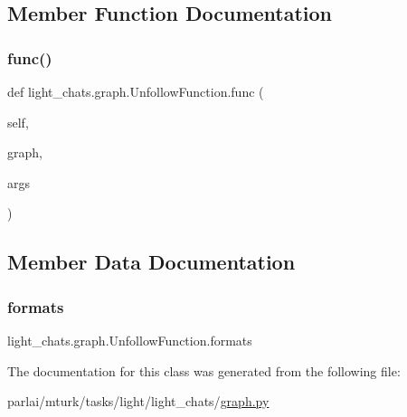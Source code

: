 \subsection{Member Function Documentation}
\mbox{\label{classlight__chats_1_1graph_1_1UnfollowFunction_a09b37c0a471f8dd65216e434a98983af}} 
\subsubsection{\texorpdfstring{func()}{func()}}
{\footnotesize\ttfamily def light\+\_\+chats.\+graph.\+Unfollow\+Function.\+func (\begin{DoxyParamCaption}\item[{}]{self,  }\item[{}]{graph,  }\item[{}]{args }\end{DoxyParamCaption})}



\subsection{Member Data Documentation}
\mbox{\label{classlight__chats_1_1graph_1_1UnfollowFunction_a9b7464a052add385de3d685e1627fcf5}} 
\subsubsection{\texorpdfstring{formats}{formats}}
{\footnotesize\ttfamily light\+\_\+chats.\+graph.\+Unfollow\+Function.\+formats}



The documentation for this class was generated from the following file\+:\begin{DoxyCompactItemize}
\item 
parlai/mturk/tasks/light/light\+\_\+chats/\hyperlink{parlai_2mturk_2tasks_2light_2light__chats_2graph_8py}{graph.\+py}\end{DoxyCompactItemize}
